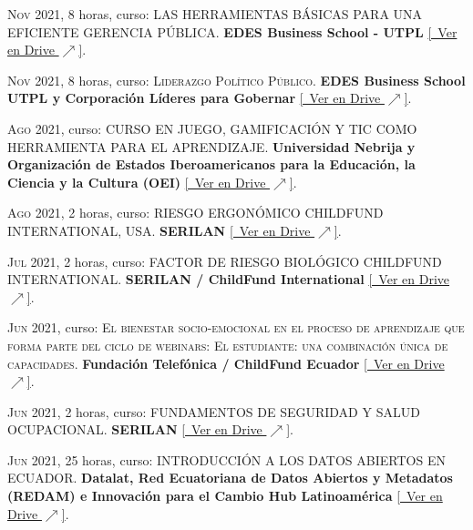 \documentclass[a4paper]{article}
\begin{document}
\textsc{Nov} 2021, 8 horas, curso: \textsc{LAS HERRAMIENTAS BÁSICAS PARA UNA EFICIENTE GERENCIA PÚBLICA}.
\textbf{EDES Business School - UTPL} \small \href{https://drive.google.com/file/d/1L43Wwwi35VZcl6XTrmDdVHyA4eALTTbd/view}{[\faGoogleDrive~Ver en Drive $\nearrow$]}.

\textsc{Nov} 2021, 8 horas, curso: \textsc{Liderazgo Político Público}.
\textbf{EDES Business School UTPL y Corporación Líderes para Gobernar} \small \href{https://drive.google.com/file/d/18B7V7dHwWEF8ZagfKxFhVki3bjoARL1I/view}{[\faGoogleDrive~Ver en Drive $\nearrow$]}.

\textsc{Ago} 2021, curso: \textsc{CURSO EN JUEGO, GAMIFICACIÓN Y TIC COMO HERRAMIENTA PARA EL APRENDIZAJE}.
\textbf{Universidad Nebrija y Organización de Estados Iberoamericanos para la Educación, la Ciencia y la Cultura (OEI)} \small \href{https://drive.google.com/file/d/1tzqvacqwNXBvGohvBaACAI-S55y9Zk7g/view}{[\faGoogleDrive~Ver en Drive $\nearrow$]}.

\textsc{Ago} 2021, 2 horas, curso: \textsc{RIESGO ERGONÓMICO CHILDFUND INTERNATIONAL, USA}.
\textbf{SERILAN} \small \href{https://drive.google.com/file/d/1vwdPuAOWRzYNgFmQ246-vXo0RCgPA5Av/view}{[\faGoogleDrive~Ver en Drive $\nearrow$]}.

\textsc{Jul} 2021, 2 horas, curso: \textsc{FACTOR DE RIESGO BIOLÓGICO CHILDFUND INTERNATIONAL}.
\textbf{SERILAN / ChildFund International} \small \href{https://drive.google.com/file/d/1bwwEkN6YL_5reVFE8N90gBPzOPHTionU/view}{[\faGoogleDrive~Ver en Drive $\nearrow$]}.

\textsc{Jun} 2021, curso: \textsc{El bienestar socio-emocional en el proceso de aprendizaje que forma parte del ciclo de webinars: El estudiante: una combinación única de capacidades}.
\textbf{Fundación Telefónica / ChildFund Ecuador} \small \href{https://drive.google.com/file/d/1zczayzPU4Ko8OLeMidqF_ZfIFajr6GyI/view}{[\faGoogleDrive~Ver en Drive $\nearrow$]}.

\textsc{Jun} 2021, 2 horas, curso: \textsc{FUNDAMENTOS DE SEGURIDAD Y SALUD OCUPACIONAL}.
\textbf{SERILAN} \small \href{https://drive.google.com/file/d/1nuayD8dRuxKe-XldIz8qr85QMyrfQMNi/view}{[\faGoogleDrive~Ver en Drive $\nearrow$]}.

\textsc{Jun} 2021, 25 horas, curso: \textsc{INTRODUCCIÓN A LOS DATOS ABIERTOS EN ECUADOR}.
\textbf{Datalat, Red Ecuatoriana de Datos Abiertos y Metadatos (REDAM) e Innovación para el Cambio Hub Latinoamérica} \small \href{https://drive.google.com/file/d/1lRm4vQX0PRh5YFKGv8Xp25NnAAwjbVOw/view}{[\faGoogleDrive~Ver en Drive $\nearrow$]}.
\end{document}
